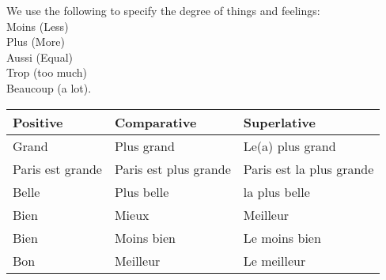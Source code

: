We use the following to specify the degree of things and feelings:\\
Moins (Less) \\
Plus (More) \\
Aussi (Equal) \\
Trop (too much) \\
Beaucoup (a lot).

\vspace{0.5cm}
\begin{tabular}{l | l | l}
Positive  & Comparative & Superlative \\ \hline
Grand     & Plus grand  & Le(a) plus grand \\
Paris est grande & Paris est plus grande & Paris est la plus grande \\
Belle     & Plus belle  & la plus belle \\
Bien      & Mieux       & Meilleur  \\
Bien      & Moins bien  & Le moins bien \\
Bon       & Meilleur    & Le meilleur \\
\end{tabular}



